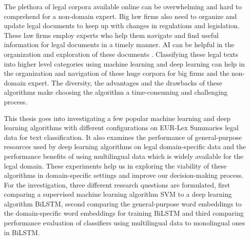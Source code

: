 The plethora of legal corpora available online can be overwhelming and hard to comprehend for a non-domain expert. Big law firms also need to organize and update legal documents to keep up with changes in regulations and legislation. These law firms employ experts who help them navigate and find useful information for legal documents in a timely manner. \gls{AI} can be helpful in the organization and exploration of these documents \cite{merkl1997exploration}.  Classifying these legal texts into higher level categories using machine learning and deep learning can help in the organization and navigation of these huge corpora for big firms and the non-domain expert. The diversity, the advantages and the drawbacks of these algorithms make choosing the algorithm a time-consuming and challenging process.

This thesis goes into investigating a few popular machine learning and deep learning algorithms with different configurations on EUR-Lex Summaries legal data for text classification. It also examines the performance of general-purpose resources used by deep learning algorithms on legal domain-specific data and the performance benefits of using multilingual data which is widely available for the legal domain. These experiments help us in exploring the viability of these algorithms in domain-specific settings and improve our decision-making process.  For the investigation, three different research questions are formulated, first comparing a supervised machine learning algorithm  \gls{SVM} to a deep learning algorithm \gls{BiLSTM}, second comparing the general-purpose word embeddings to the domain-specific word embeddings for training \gls{BiLSTM} and third comparing performance evaluation of classifiers using multilingual data to monolingual ones in \gls{BiLSTM}.

